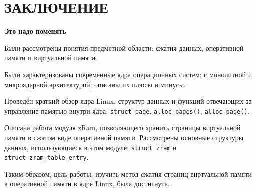 \section*{ЗАКЛЮЧЕНИЕ}

\textbf{Это надо поменять}

Были рассмотрены понятия предметной области: сжатия данных, оперативной памяти и виртуальной памяти. 

Были характеризованы современные ядра операционных систем: с монолитной и микроядерной архитектурой, описаны их плюсы и минусы.

Проведён краткий обзор ядра Linux, структур данных и функций отвечающих за управление памятью внутри ядра: \texttt{struct page}, \texttt{alloc\_pages()}, \texttt{alloc\_page()}.

Описана работа модуля zRam, позволяющего хранить страницы виртуальной памяти в сжатом виде оперативной памяти. Рассмотрены основные структуры данных, использующиеся в этом модуле: \texttt{struct zram} и\\ \texttt{struct zram\_table\_entry}.

Таким образом, цель работы, изучить метод сжатия страниц виртуальной памяти в оперативной памяти в ядре Linux, была достигнута.

\pagebreak